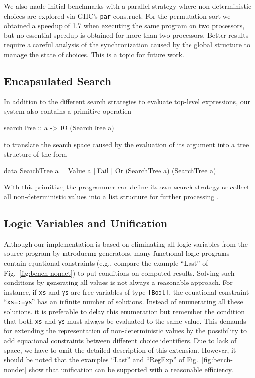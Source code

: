 \documentclass{llncs}
\newcommand{\code}[1]{\mbox{\small\texttt{#1}}}
\newcommand{\ccode}[1]{``\code{#1}''}
\begin{document}
We also made initial benchmarks with a parallel strategy
where non-deterministic choices are explored via GHC's \code{par}
construct. For the permutation sort we obtained a speedup of 1.7
when executing the same program on two processors, but no essential
speedup is obtained for more than two processors.
Better results require a careful analysis of the synchronization
caused by the global structure to manage the state of choices.
This is a topic for future work.

\subsection{Encapsulated Search}

In addition to the different search strategies to evaluate
top-level expressions, our system also contains a primitive operation
\begin{curry}
 searchTree :: a -> IO (SearchTree a)
\end{curry}
to translate the search space caused by the evaluation of its argument
into a tree structure of the form
\begin{curry}
 data SearchTree a = Value a | Fail | Or (SearchTree a) (SearchTree a)
\end{curry}
With this primitive,
the programmer can define its own search strategy or
collect all non-deterministic values into a list structure
for further processing \cite{BrasselHuch07}.


\subsection{Logic Variables and Unification}
\label{sec:unification}

Although our implementation is based on eliminating all logic
variables from the source program by introducing generators,
many functional logic programs contain equational constraints
(e.g., compare the example ``Last'' of Fig.~\ref{fig:bench-nondet})
to put conditions on computed results.
Solving such conditions by generating all values is not always
a reasonable approach. For instance, if \code{xs} and \code{ys}
are free variables of type \code{[Bool]}, the equational
constraint \ccode{xs=:=ys} has an infinite number of solutions.
Instead of enumerating all these solutions, it is preferable to
delay this enumeration but remember the condition that both
\code{xs} and \code{ys} must always be evaluated to the same value.
This demands for extending the representation of non-deterministic
values by the possibility to add equational constraints between
different choice identifiers.
Due to lack of space, we have to omit the detailed description
of this extension.
However, it should be noted that the examples
``Last'' and ``RegExp'' of Fig.~\ref{fig:bench-nondet}
show that unification can be supported with a reasonable efficiency.
\end{document}
